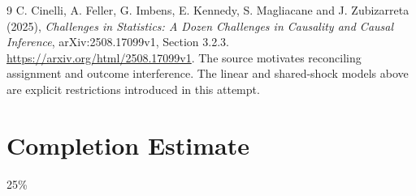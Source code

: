 \documentclass[11pt,a4paper]{article}
\theoremstyle{remark}
\begin{document}
\begin{thebibliography}{9}
 C. Cinelli, A. Feller, G. Imbens, E. Kennedy, S. Magliacane and J. Zubizarreta (2025), \emph{Challenges in Statistics: A Dozen Challenges in Causality and Causal Inference}, arXiv:2508.17099v1, Section 3.2.3. \url{https://arxiv.org/html/2508.17099v1}. The source motivates reconciling assignment and outcome interference. The linear and shared-shock models above are explicit restrictions introduced in this attempt.
\end{thebibliography}

\section{Completion Estimate}
25\%
\end{document}
